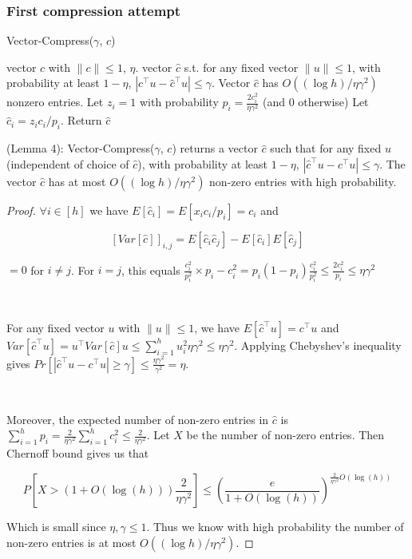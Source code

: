 \iffalse

\subsubsection{First compression attempt}

\begin{algorithm}
\caption{Vector-Compress($\gamma$, $c$)}
\begin{algorithmic}
\REQUIRE vector $c$ with $\|c\| \le 1$, $\eta$.
\ENSURE vector $\hat{c}$ s.t. for any fixed vector $\|u\| \le 1$, with probability at least $1-\eta$, $|c^\top u - \hat{c}^\top u| \le \gamma$. Vector $\hat{c}$ has $O((\log h)/\eta\gamma^2)$ nonzero entries. 
\STATE Let $z_i = 1$ with probability $p_i = \frac{2c_i^2}{\eta\gamma^2}$ (and $0$ otherwise)
\STATE Let $\hat{c}_i = z_i c_i/p_i$.
\ENDFOR
\STATE Return $\hat{c}$
\end{algorithmic}
\label{alg:vec-compress}
\end{algorithm}


(Lemma 4): Vector-Compress($\gamma$, $c$) returns a vector $\hat{c}$ such that for any fixed $u$ (independent of choice of $\hat{c}$), with probability at least $1-\eta$, $|\hat{c}^\top u - c^\top u| \le \gamma$. The vector $\hat{c}$ has at most $O((\log h)/\eta\gamma^2)$ non-zero entries with high probability.


\begin{proof}

$\forall i \in [h]$ we have $E[\hat{c}_i]=E[x_{i}c_{i}/p_i]= c_i$ and 

$$[Var[\hat{c}]]_{i,j}=E[\hat{c}_{i}\hat{c}_{j}]-E[\hat{c}_{i}]E[\hat{c}_{j}]$$

$=0$ for $i \not =j$. For $i=j$, this equals $\frac{c_i^2}{p_i^2}\times p_i -c_i^2=p_i(1-p_i) \frac{c_i^2}{p_i^2} \le \frac{2c_i^2}{p_i} \le \eta\gamma^2$

\

For any fixed vector $u$ with $\|u\|\leq1$, we have $E[\hat{c}^\top u] = c^\top u$ and $Var[\hat{c}^\top u] =u^{\top} Var[\hat{c}]u \leq \sum_{i=1}^h u_i^2 \eta\gamma^2 \leq \eta\gamma^2$. Applying Chebyshev's inequality gives $Pr[|\hat{c}^\top u - c^\top u| \ge \gamma] \le \frac{\eta\gamma^2}{\gamma^2}=\eta$.

\ 

Moreover, the expected number of non-zero entries in $\hat{c}$ is $\sum_{i=1}^h p_i=\frac{2}{\eta \gamma^2}\sum_{i=1}^h  c_i^2 \leq \frac{2}{\eta \gamma^2}$. Let $X$ be the number of non-zero entries. Then Chernoff bound gives us that

$$P\left[X>(1+O(\log(h)))\frac{2}{\eta \gamma^2}\right]\leq \left(\frac{e}{1+O(\log(h))}\right)^{\frac{2}{\eta \gamma^2}O(\log(h))}$$

Which is small since $\eta,\gamma\leq 1$. Thus we know with high probability the number of non-zero entries is at most $O((\log h)/\eta\gamma^2)$. 
\end{proof}

